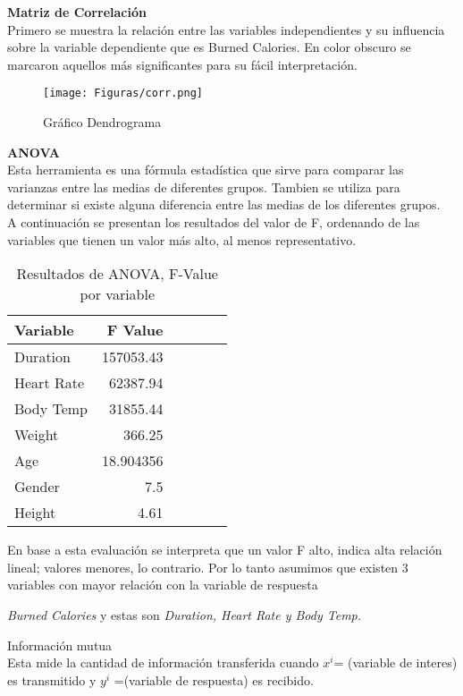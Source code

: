 \documentclass[5p,times,authoryear]{sciarticle}
\begin{document}
\begin{multicols}{2}
\textbf{Matriz de Correlación} \\
Primero se muestra la relación entre las variables independientes y su influencia sobre la variable dependiente que es Burned Calories. En color obscuro se marcaron aquellos más significantes para su fácil interpretación.

\begin{figure}[H]
\centering
  \texttt{[image: Figuras/corr.png]}\\
  \caption{Gráfico Dendrograma}\label{fig1}
\end{figure}

\textbf{ANOVA} \\
Esta herramienta es una fórmula estadística que sirve para comparar las varianzas entre las medias de diferentes grupos. Tambien se utiliza para determinar si existe alguna diferencia entre las medias de los diferentes grupos.\\

A continuación se presentan los resultados del valor de F, ordenando de las variables que tienen un valor más alto, al menos representativo. 
\begin{table}[H]
  \caption{Resultados de ANOVA, F-Value por variable}
   \label{extremos45}
  \begin{tabular*}{\hsize}{lrrrrr}
\hline
Variable & F Value\\
   \hline
Duration & 157053.43 \\
Heart Rate &  62387.94 \\
Body Temp & 31855.44 \\
Weight & 366.25  \\
Age	 &	18.904356\\
Gender & 7.5 \\
Height & 4.61 \\
\hline
  \end{tabular*}
\end{table}

En base a esta evaluación se  interpreta que un valor F alto, indica alta relación lineal; valores menores, lo contrario. Por lo tanto asumimos que existen 3 variables con mayor relación con la variable de respuesta {\emph {Burned Calories} y estas son \emph{ \emph {Duration, Heart Rate y Body Temp.}} 

Información mutua\\
Esta mide la cantidad de información transferida cuando ${x}^{i}$= (variable de interes) es transmitido y ${y}^{i}$ =(variable de respuesta) es recibido.

}
\end{multicols}
\end{document}
